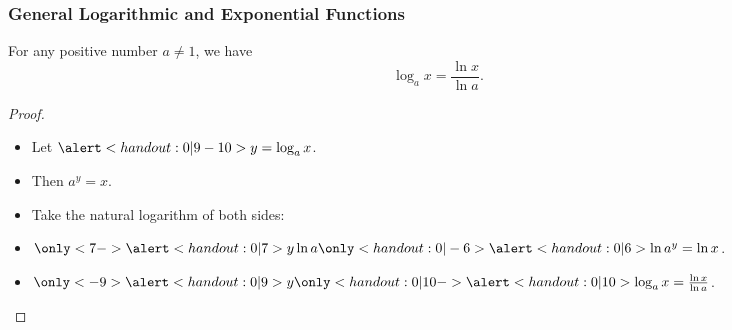 \begin{frame}
\frametitle{General Logarithmic and Exponential Functions}
\begin{theorem}
For any positive number $a \neq 1$, we have
\[
\log_a x = \frac{\ln x}{\ln a} .
\]
\end{theorem}
\begin{proof}
\begin{itemize}
\item<2->  Let $\alert<handout:0| 9-10>{y = \log_a x}$.
\item<3->  Then $a^y = x$.
\item<4->  Take the natural logarithm of both sides:
\item<5->  $\only<7->{\alert<handout:0| 7>{y \ln a}}\only<handout:0| -6>{\alert<handout:0| 6>{\ln a^y}} = \ln x$.
\item<8->  $\only<-9>{\alert<handout:0| 9>{y}}\only<handout:0| 10->{\alert<handout:0| 10>{\log_a x}}=\frac{\ln x}{\ln a} $.
\end{itemize}
\end{proof}
\end{frame}
